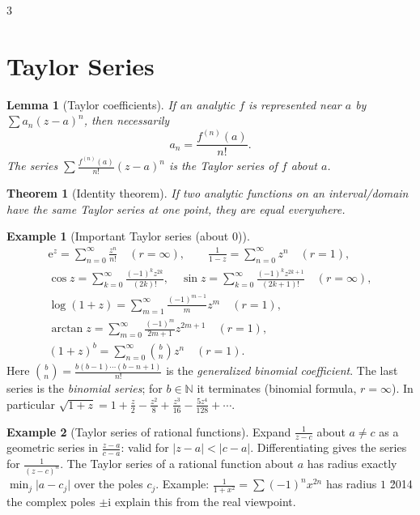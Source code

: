 \documentclass[10pt,a4paper,landscape]{article}
\theoremstyle{definition}
\newtheorem{exm}{Example}[section]
\theoremstyle{plain}
\newtheorem{thm}{Theorem}[section]
\newtheorem{lem}{Lemma}[section]
\theoremstyle{remark}
\newcommand{\N}{\mathbb{N}}
\newcommand{\e}{\mathrm{e}}
\newcommand{\abs}[1]{\lvert #1 \rvert}
\newcommand{\oo}{\infty}
\begin{document}
\begin{multicols*}{3}
\section{Taylor Series}

\begin{lem}[Taylor coefficients]
If an analytic $f$ is represented near $a$ by $\sum a_n (z-a)^n$, then necessarily
\[
a_n = \frac{f^{(n)}(a)}{n!}.
\]
The series $\sum \frac{f^{(n)}(a)}{n!} (z-a)^n$ is the \emph{Taylor series} of $f$ about $a$.
\end{lem}

\begin{thm}[Identity theorem]
If two analytic functions on an interval/domain have the same Taylor series at one point, they are equal everywhere.
\end{thm}

\begin{exm}[Important Taylor series (about $0$)]
{\footnotesize\[
\begin{gathered}
\e^z = \sum_{n=0}^{\oo} \frac{z^n}{n!} \quad (r = \oo),\qquad
\frac{1}{1-z} = \sum_{n=0}^{\oo} z^n \quad (r = 1),\\
\cos z = \sum_{k=0}^{\oo} \frac{(-1)^k z^{2k}}{(2k)!},\quad
\sin z = \sum_{k=0}^{\oo} \frac{(-1)^k z^{2k+1}}{(2k+1)!} \quad (r = \oo),\\
\log(1+z) = \sum_{m=1}^{\oo} \frac{(-1)^{m-1}}{m} z^m \quad (r = 1),\\
\arctan z = \sum_{m=0}^{\oo} \frac{(-1)^m}{2m+1} z^{2m+1} \quad (r = 1),\\
(1+z)^b = \sum_{n=0}^{\oo} \binom{b}{n} z^n \quad (r = 1).
\end{gathered}
\]}
Here $\binom{b}{n} = \frac{b(b-1)\cdots(b-n+1)}{n!}$ is the \emph{generalized binomial coefficient}. The last series is the \emph{binomial series}; for $b \in \N$ it terminates (binomial formula, $r = \oo$). In particular $\sqrt{1+z} = 1 + \frac{z}{2} - \frac{z^2}{8} + \frac{z^3}{16} - \frac{5z^4}{128} + \cdots$.
\end{exm}

\begin{exm}[Taylor series of rational functions]
Expand $\frac{1}{z-c}$ about $a \neq c$ as a geometric series in $\frac{z-a}{c-a}$: valid for $\abs{z-a} < \abs{c-a}$. Differentiating gives the series for $\frac{1}{(z-c)^n}$. The Taylor series of a rational function about $a$ has radius exactly $\min_j \abs{a - c_j}$ over the poles $c_j$. Example: $\frac{1}{1+x^2} = \sum (-1)^n x^{2n}$ has radius $1$ \u2014 the complex poles $\pm\mathrm{i}$ explain this from the real viewpoint.
\end{exm}


\end{multicols*}
\end{document}
